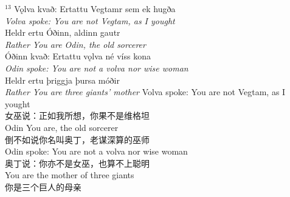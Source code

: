 \begin{paracol}{2}
  \noindent
  $^{13}$ Vǫlva kvað: Ertattu Vegtamr sem ek hugða\\
  \textit{Volva spoke: You are not Vegtam, as I yought}\\
  Heldr ertu Óðinn, aldinn gautr\\
  \textit{Rather You are Odin, the old sorcerer}\\
  Óðinn kvað: Ertattu vǫlva né víss kona\\
  \textit{Odin spoke: You are not a volva nor wise woman}\\
  Heldr ertu þriggja þursa móðir\footnotemark\\
  \textit{Rather You are three giants' mother}
  \switchcolumn
  \noindent
  Volva spoke: You are not Vegtam, as I yought\\
  女巫说：正如我所想，你果不是维格坦\\
  Odin You are, the old sorcerer\\
  倒不如说你名叫奥丁，老谋深算的巫师\\
  Odin spoke: You are not a volva nor wise woman\\
  奥丁说：你亦不是女巫，也算不上聪明\\
  You are the mother of three giants\\
  你是三个巨人的母亲
\end{paracol}


